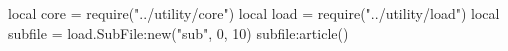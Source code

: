 \documentclass[11pt, a4paper]{ltjsarticle}
\date{\today}
\title{}
\author{}
\begin{document}
\maketitle
\tableofcontents

\begin{luacode*}
    local core = require("../utility/core")
    local load = require("../utility/load")
    local subfile = load.SubFile:new("sub", 0, 10)
    subfile:article()
\end{luacode*}



\end{document}

